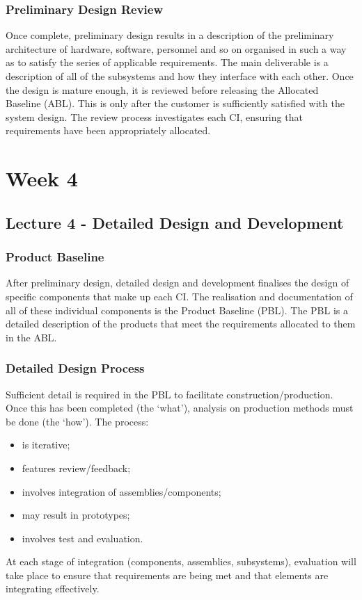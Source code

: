 \documentclass[journal]{IEEEtran}
\begin{document}
\subsubsection{Preliminary Design Review}
Once	complete, preliminary design results in a description of the preliminary architecture of hardware, software, personnel and so on organised in such a way as to satisfy the series of applicable requirements. The main deliverable is a description of all of the subsystems and how they interface with each other. Once the design is mature enough, it is reviewed before releasing the Allocated Baseline (ABL). This is only after the customer is sufficiently satisfied with the system design. The review process investigates each CI, ensuring that requirements have been appropriately allocated.
\section{Week 4}
\subsection{\textbf{Lecture 4 - Detailed Design and Development}}
\subsubsection{\textbf{Product Baseline}}
After preliminary design, detailed design and development finalises the design of specific components that make up each CI. The realisation and documentation of all of these individual components is the Product Baseline (PBL). The PBL is a detailed description of the products that meet the requirements allocated to them in the ABL.
\subsubsection{\textbf{Detailed Design Process}}
Sufficient detail is required in the PBL to facilitate construction/production. Once this has been completed (the `what'), analysis on production methods must be done (the `how'). The process:
\begin{itemize}
	\item is iterative;
	\item features review/feedback;
	\item involves integration of assemblies/components;
	\item may result in prototypes;
	\item involves test and evaluation.
\end{itemize}
At each stage of integration (components, assemblies, subsystems), evaluation will take place to ensure that requirements are being met and that elements are integrating effectively.
\end{document}
